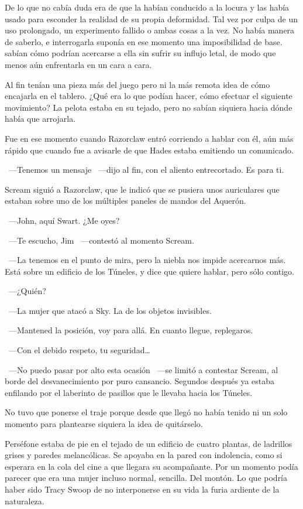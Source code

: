 De lo que no cabía duda era de que la habían conducido a la locura y las había usado para esconder la realidad de su propia deformidad. Tal vez por culpa de un uso prolongado, un experimento fallido o ambas cosas a la vez. No había manera de saberlo, e interrogarla suponía en ese momento una imposibilidad de base.  sabían cómo podrían acercarse a ella sin sufrir su influjo letal, de modo que menos aún enfrentarla en un cara a cara.

Al fin tenían una pieza más del juego pero ni la más remota idea de cómo encajarla en el tablero. ¿Qué era lo que podían hacer, cómo efectuar el siguiente movimiento? La pelota estaba en su tejado, pero no sabían siquiera hacia dónde había que arrojarla.

Fue en ese momento cuando Razorclaw entró corriendo a hablar con él, aún más rápido que cuando fue a avisarle de que Hades estaba emitiendo un comunicado.

~---Tenemos un mensaje ~---dijo al fin, con el aliento entrecortado. Es para ti.

Scream siguió a Razorclaw, que le indicó que se pusiera unos auriculares que estaban sobre uno de los múltiples paneles de mandos del Aquerón.

~---John, aquí Swart. ¿Me oyes?

~---Te escucho, Jim ~---contestó al momento Scream.

~---La tenemos en el punto de mira, pero la niebla nos impide acercarnos más. Está sobre un edificio de los Túneles, y dice que quiere hablar, pero sólo contigo.

~---¿Quién?

~---La mujer que atacó a Sky. La de los objetos invisibles.

~---Mantened la posición, voy para allá. En cuanto llegue, replegaros.

~---Con el debido respeto, tu seguridad\dots

~---No puedo pasar por alto esta ocasión ~---se limitó a contestar Scream, al borde del desvanecimiento por puro cansancio. Segundos después ya estaba enfilando por el laberinto de pasillos que le llevaba hacia los Túneles.

No tuvo que ponerse el traje porque desde que llegó no había tenido ni un solo momento para plantearse siquiera la idea de quitárselo.

\parbreak
Perséfone estaba de pie en el tejado de un edificio de cuatro plantas, de ladrillos grises y paredes melancólicas. Se apoyaba en la pared con indolencia, como si esperara en la cola del cine a que llegara su acompañante. Por un momento podía parecer que era una mujer incluso normal, sencilla. Del montón. Lo que podría haber sido Tracy Swoop de no interponerse en su vida la furia ardiente de la naturaleza.


